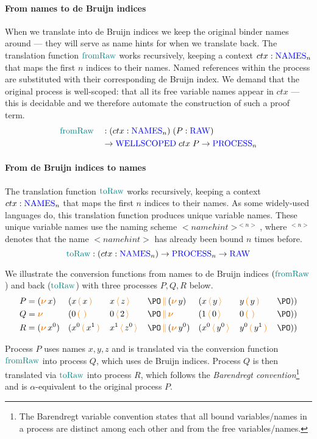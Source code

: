 \paragraph*{From names to de Bruijn indices}
When we translate into de Bruijn indices we keep the original binder names around --- they will serve as name hints for when we translate back.
The translation function $\textcolor{teal}{\operatorname{fromRaw}}$ works recursively, keeping a context $ctx : \textcolor{blue}{\operatorname{NAMES}}_n$ that maps the first $n$ indices to their names.
Named references within the process are substituted with their corresponding de Bruijn index.
We demand that the original process is well-scoped: that all its free variable names appear in $ctx$ --- this is decidable and we therefore automate the construction of such a proof term.
\begin{alignat*}{2}
    &\textcolor{teal}{\operatorname{fromRaw}} && : (ctx : \textcolor{blue}{\operatorname{NAMES}}_n) \; (P : \textcolor{blue}{\operatorname{RAW}}) \\
    &               && \to \textcolor{blue}{\operatorname{WELLSCOPED}} \; ctx \; P \to \textcolor{blue}{\operatorname{PROCESS}}_n
\end{alignat*}

\paragraph*{From de Bruijn indices to names}
The translation function $\textcolor{teal}{\operatorname{toRaw}}$ works recursively, keeping a context $ctx : \textcolor{blue}{\operatorname{NAMES}}_n$ that maps the first $n$ indices to their names.
As some widely-used languages do, this translation function produces unique variable names.
These unique variable names use the naming scheme $<namehint>^{<n>}$, where $^{<n>}$ denotes that the name $<namehint>$ has already been bound $n$ times before.
\begin{equation*}
    \textcolor{teal}{\operatorname{toRaw}} : (ctx : \textcolor{blue}{\operatorname{NAMES}}_n) \to \textcolor{blue}{\operatorname{PROCESS}}_n \to \textcolor{blue}{\operatorname{RAW}}
\end{equation*}

\begin{example}
  We illustrate the conversion functions from names to de Bruijn indices $(\textcolor{teal}{\operatorname{fromRaw}}$) and back ($\textcolor{teal}{\operatorname{toRaw}}$) with three processes $P,Q,R$  below.
  \begin{alignat*}{7}
    &P = (\new{x} ) && (\comp {\recv{x}{x} && \send{x}{z} && \PO} {(\new{y}) && (\send{x}{y} && \recv{y}{y} && \PO)}) \\
    &Q = \new{} && (\comp {\recv{0}{} && \send{0}{2} && \PO} {\new{} && (\send{1}{0} && \recv{0}{} && \PO)}) \\
    &R = (\new{x^0} ) && (\comp {\recv{x^0}{x^1} && \send{x^1}{z^0} && \PO} {(\new{y^0}) && (\send{x^0}{y^0} && \recv{y^0}{y^1} && \PO)})
  \end{alignat*}

  Process $P$ uses names $x,y,z$ and is translated via the conversion function $\textcolor{teal}{\operatorname{fromRaw}}$ into process $Q$, which uses de Bruijn indices.
  Process $Q$ is then translated via $\textcolor{teal}{\operatorname{toRaw}}$ into process $R$, which follows the \emph{Barendregt convention}\footnote{The Barendregt variable convention states that all bound variables/names in a process are distinct among each other and from the free variables/names.} and is $\alpha$-equivalent to the original process $P$.
\end{example}

